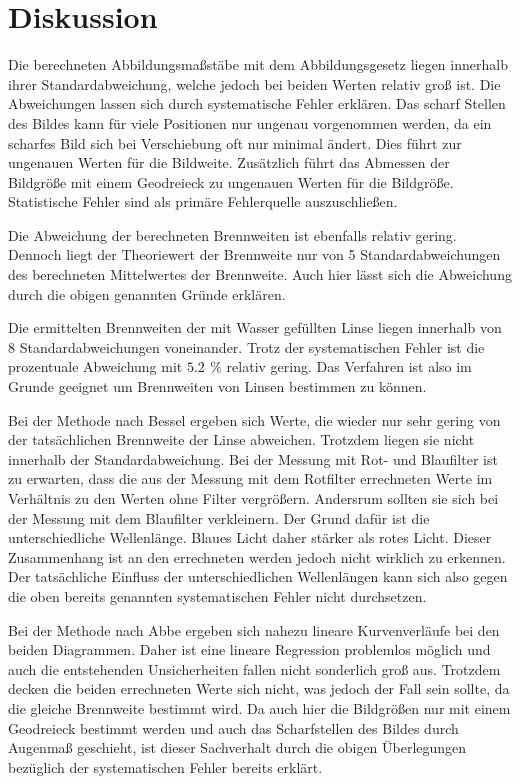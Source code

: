 \section{Diskussion}
\label{sec:Diskussion}
Die berechneten Abbildungsmaßstäbe mit dem Abbildungsgesetz liegen innerhalb ihrer Standardabweichung, welche
jedoch bei beiden Werten relativ groß ist. Die Abweichungen lassen sich durch systematische Fehler erklären.
Das scharf Stellen des Bildes kann für viele Positionen nur ungenau vorgenommen werden, da ein
scharfes Bild sich bei Verschiebung oft nur minimal ändert. Dies führt zur ungenauen Werten für die Bildweite.
Zusätzlich führt das Abmessen der Bildgröße mit einem Geodreieck zu ungenauen Werten für die Bildgröße.
Statistische Fehler sind als primäre Fehlerquelle auszuschließen.

Die Abweichung der berechneten Brennweiten ist ebenfalls relativ gering. Dennoch liegt der
Theoriewert der Brennweite nur von 5 Standardabweichungen des berechneten Mittelwertes der Brennweite. Auch hier lässt
sich die Abweichung durch die obigen genannten Gründe erklären.

Die ermittelten Brennweiten der mit Wasser gefüllten Linse liegen innerhalb von 8 Standardabweichungen voneinander.
Trotz der systematischen Fehler ist die prozentuale Abweichung mit $\SI{5.2}{} \, \%$ relativ gering. %
Das Verfahren ist also im Grunde geeignet um Brennweiten von Linsen bestimmen zu können.


Bei der Methode nach Bessel ergeben sich Werte, die wieder nur sehr gering von der tatsächlichen Brennweite der
Linse abweichen. Trotzdem liegen sie nicht innerhalb der Standardabweichung.
Bei der Messung mit Rot- und Blaufilter ist zu erwarten, dass die aus der Messung mit dem Rotfilter errechneten Werte
im Verhältnis zu den Werten ohne Filter vergrößern. Andersrum sollten sie sich bei der Messung mit dem Blaufilter verkleinern.
Der Grund dafür ist die unterschiedliche Wellenlänge. Blaues Licht daher stärker als rotes Licht. Dieser Zusammenhang ist
an den errechneten werden jedoch nicht wirklich zu erkennen. Der tatsächliche Einfluss der unterschiedlichen Wellenlängen
kann sich also gegen die oben bereits genannten systematischen Fehler nicht durchsetzen.

Bei der Methode nach Abbe ergeben sich nahezu lineare Kurvenverläufe bei den beiden Diagrammen. Daher ist eine
lineare Regression problemlos möglich und auch die entstehenden Unsicherheiten fallen nicht sonderlich groß aus.
Trotzdem decken die beiden errechneten Werte sich nicht, was jedoch der Fall sein sollte, da die gleiche Brennweite
bestimmt wird. Da auch hier die Bildgrößen nur mit einem Geodreieck bestimmt werden und auch das Scharfstellen des Bildes
durch Augenmaß geschieht, ist dieser Sachverhalt durch die obigen Überlegungen bezüglich der systematischen Fehler
bereits erklärt.

